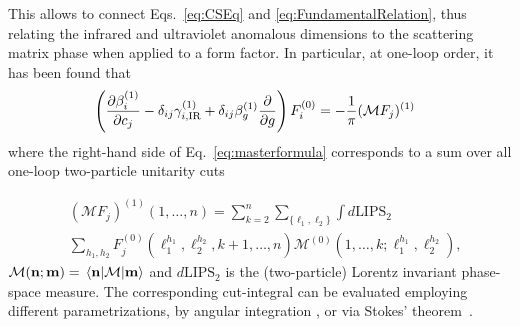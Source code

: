 \documentclass[prl,twocolumn,twoside,preprintnumbers,superscriptaddress, nofootinbib]{revtex4-2}
\renewcommand{\vec}[1]{{\mathbf #1}}
\newcommand{\txt}[1]{\textup{#1}}
\begin{document}
This allows to connect Eqs.~\eqref{eq:CSEq} and \eqref{eq:FundamentalRelation}, thus relating the 
infrared and ultraviolet anomalous dimensions to the 
scattering matrix phase when applied to a form factor. 
In particular, at one-loop order, it has been found that
%
\begin{equation}
\label{eq:masterformula}
\!\!\!\!
\left(
\frac{\partial \beta_i^{(1)}}{\partial c_j}
-\delta_{ij}\gamma_{i,\txt{IR}}^{(1)} 
+\delta_{ij}\beta_g^{(1)}\frac{\partial}{\partial g}
\right)
F_i^{(0)} = -\frac{1}{\pi}(\mathcal M F_j)^{(1)}
\end{equation}
%
%
%
where the right-hand side of Eq.~\eqref{eq:masterformula} corresponds to a sum over all one-loop two-particle unitarity cuts
%

%
\begin{align}
\label{eq:MF1Loop}
    &\!\!(\mathcal M F_j)^{(1)}(1,\dots,n) = 
   \sum_{k=2}^n \sum_{\{\ell_1,\ell_2\}}\int d\text{LIPS}_2 
   \nonumber\\ 
   &\!\!\sum_{h_1,h_2}\!\! F_j^{(0)}\!(\ell_1^{h_1},\ell_2^{h_2},k \!+\! 1,\dots,n) \mathcal M^{(0)}\!(1,\dots,k;\ell_1^{h_1},\ell_2^{h_2}\!) ,
\end{align}
$\mathcal M(\vec n; \vec m)=\mel*{\vec n}{\mathcal M}{\vec m}$ and $d\text{LIPS}_2$ is the (two-particle) Lorentz invariant phase-space measure. The corresponding  cut-integral can be evaluated employing different parametrizations,  
by angular integration \cite{Caron-Huot:2016cwu,EliasMiro:2020tdv,Baratella:2020lzz,Bern:2020ikv,Baratella:2020dvw}, 
or via Stokes' theorem~\cite{Mastrolia:2009dr,Jiang:2020mhe}.
\\
\end{document}
